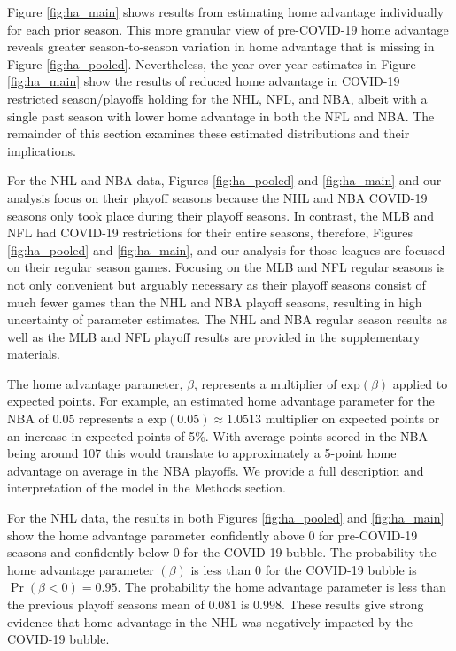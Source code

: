 Figure \mbox{\ref{fig:ha_main}} shows results from estimating home advantage individually for each prior season. This more granular view of pre-COVID-19 home advantage reveals greater season-to-season variation in home advantage that is missing in Figure \mbox{\ref{fig:ha_pooled}}. Nevertheless, the year-over-year estimates in Figure \mbox{\ref{fig:ha_main}} show the results of reduced home advantage in COVID-19 restricted season/playoffs holding for the NHL, NFL, and NBA, albeit with a single past season with lower home advantage in both the NFL and NBA. The remainder of this section examines these estimated distributions and their implications.

For the NHL and NBA data, Figures \mbox{\ref{fig:ha_pooled}} and \mbox{\ref{fig:ha_main}} and our analysis focus on their playoff seasons because the NHL and NBA COVID-19 seasons only took place during their playoff seasons. In contrast, the MLB and NFL had COVID-19 restrictions for their entire seasons, therefore, Figures \mbox{\ref{fig:ha_pooled}} and \mbox{\ref{fig:ha_main}}, and our analysis for those leagues are focused on their regular season games. Focusing on the MLB and NFL regular seasons is not only convenient but arguably necessary as their playoff seasons consist of much fewer games than the NHL and NBA playoff seasons, resulting in high uncertainty of parameter estimates. The NHL and NBA regular season results as well as the MLB and NFL playoff results are provided in the supplementary materials.

The home advantage parameter, $\beta$, represents a multiplier of $\text{exp}(\beta)$ applied to expected points. For example, an estimated home advantage parameter for the NBA of $0.05$ represents a $\text{exp}(0.05) \approx 1.0513$ multiplier on expected points or an increase in expected points of 5\%. With average points scored in the NBA being around 107 this would translate to approximately a 5-point home advantage on average in the NBA playoffs. We provide a full description and interpretation of the model in the Methods section.

For the NHL data, the results in both Figures \mbox{\ref{fig:ha_pooled}} and \mbox{\ref{fig:ha_main}} show the home advantage parameter confidently above 0 for pre-COVID-19 seasons and confidently below 0 for the COVID-19 bubble. The probability the home advantage parameter $(\beta)$ is less than 0 for the COVID-19 bubble is $\Pr(\beta < 0) = 0.95$. The probability the home advantage parameter is less than the previous playoff seasons mean of $0.081$ is $0.998$. These results give strong evidence that home advantage in the NHL was negatively impacted by the COVID-19 bubble.

